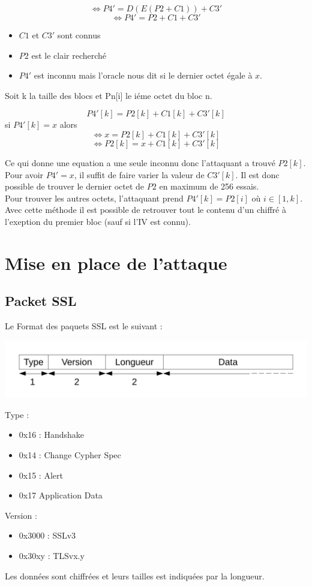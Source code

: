 \[\Longleftrightarrow P4' = D(E(P2 + C1)) + C3'\]
\[\Longleftrightarrow P4' = P2 + C1 + C3'\]
\begin{itemize}
\item $C1$ et $C3'$ sont connus
\item $P2$ est le clair recherché
\item $P4'$ est inconnu mais l'oracle nous dit si le dernier octet égale à $x$.
\end{itemize}
Soit k la taille des blocs et Pn[i] le iéme octet du bloc n.

\[P4'[k] = P2[k] + C1[k] + C3'[k]\] si $P4'[k] = x$ alors
\[\Longleftrightarrow x = P2[k] + C1[k] + C3'[k]\]
\[\Longleftrightarrow P2[k] = x + C1[k] + C3'[k]\]

Ce qui donne une equation a une seule inconnu donc l'attaquant a trouvé $P2[k]$.
Pour avoir $P4' = x$, il suffit de faire varier la valeur de $C3'[k]$. Il est donc
possible de trouver le dernier octet de $P2$ en maximum de 256 essais.\\

Pour trouver les autres octets, l'attaquant prend $P4'[k] = P2[i]$ où $i \in [1,k]$.
Avec cette méthode il est possible de retrouver tout le contenu d'un chiffré à
l'exeption du premier bloc (sauf si l'IV est connu).

\chapter{Mise en place de l'attaque}
\label{chapter:Poodleattack}

\section{Packet SSL}

Le Format des paquets SSL est le suivant : 
\begin{center}
\includegraphics[scale=0.5]{schemaSSL.pdf}
\end{center}

Type :
\begin{itemize}
\item 0x16 : Handshake
\item 0x14 : Change Cypher Spec
\item 0x15 : Alert
\item 0x17 Application Data
\end{itemize}

Version :
\begin{itemize}
\item 0x3000 : SSLv3
\item 0x30xy : TLSvx.y
\end{itemize}

Les données sont chiffrées et leurs tailles est indiquées par
la longueur.




